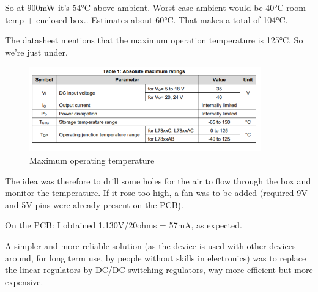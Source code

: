 \documentclass[a4paper]{article}
\begin{document}
So at 900mW it's 54°C above ambient. Worst case ambient would be 40°C room temp + enclosed box.. Estimates about 60°C. That makes a total of 104°C.

The datasheet mentions that the maximum operation temperature is 125°C. So we're just under.


\begin{figure}[h!]
    \centering
    \includegraphics[width = 10cm]{images/thermalData2.png}
    \caption{Maximum operating temperature}
    \label{fig:thermalData2}
\end{figure}

The idea was therefore to drill some holes for the air to flow through the box and monitor the temperature. If it rose too high, a fan was to be added (required 9V and 5V pins were already present on the PCB).

On the PCB: I obtained 1.130V/20ohms = 57mA, as expected.

A simpler and more reliable solution (as the device is used with other devices around, for long term use, by people without skills in electronics) was to replace the linear regulators by DC/DC switching regulators, way more efficient but more expensive.

\newpage












\end{document}
